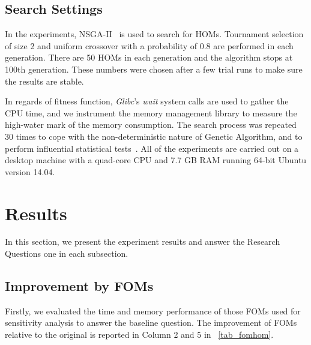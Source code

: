 \documentclass[oribibl]{llncs}
\begin{document}
\subsection{Search Settings}
\label{sec_searchsetting}

In the experiments, NSGA-II~\cite{996017} is used to search for HOMs.
Tournament selection of size 2 and uniform crossover with a probability of 0.8 are performed in each generation.
There are 50 HOMs in each generation and the algorithm stops at 100th generation.
These numbers were chosen after a few trial runs to make sure the results are stable.

In regards of fitness function, \emph{Glibc}'s \emph{wait} system calls are used to gather the CPU time, and we instrument the memory management library to measure the high-water mark of the memory consumption.
The search process was repeated 30 times to cope with the non-deterministic nature of Genetic Algorithm, and to perform influential statistical tests~\cite{STVR:STVR1486, Neumann2015}.
All of the experiments are carried out on a desktop machine with a quad-core CPU and 7.7 GB RAM running 64-bit Ubuntu version 14.04.

\section{Results}
\label{sec_result}

In this section, we present the experiment results and answer the Research Questions one in each subsection.

\subsection{Improvement by FOMs}
\label{sec_resfom}

Firstly, we evaluated the time and memory performance of those FOMs used for sensitivity analysis to answer the baseline question.
The improvement of FOMs relative to the original is reported in Column 2 and 5 in \tablename~\ref{tab_fomhom}.
\end{document}
